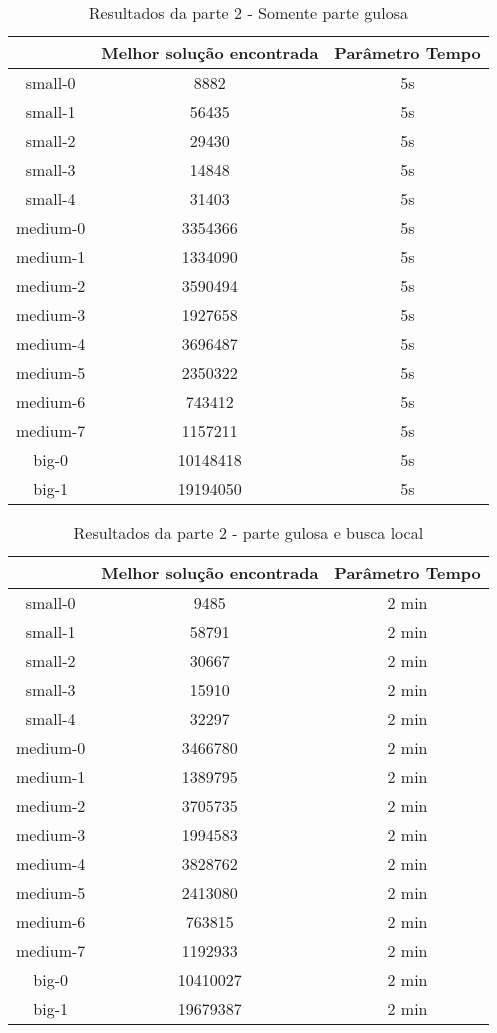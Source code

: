 \documentclass[11pt,letterpaper]{article}
\begin{document}
\begin{table}[h!]
\begin{centering}
\begin{tabular}{|c|c|c|}
\hline 
 & Melhor solução encontrada & Parâmetro Tempo  \tabularnewline
\hline 
\hline 
small-0 & 8882 & 5s \tabularnewline %
\hline 
small-1 & 56435 & 5s  \tabularnewline %
\hline 
small-2 & 29430 & 5s \tabularnewline %
\hline 
small-3 & 14848 & 5s \tabularnewline %
\hline 
small-4 & 31403 & 5s \tabularnewline %
\hline 
medium-0 & 3354366 & 5s \tabularnewline %
\hline 
medium-1 & 1334090 & 5s \tabularnewline %
\hline 
medium-2 & 3590494 & 5s \tabularnewline %
\hline 
medium-3 & 1927658 & 5s \tabularnewline %
\hline 
medium-4 & 3696487 & 5s \tabularnewline %
\hline 
medium-5 & 2350322 & 5s \tabularnewline %
\hline 
medium-6 & 743412 & 5s \tabularnewline %
\hline 
medium-7 & 1157211 & 5s \tabularnewline %
\hline 
big-0 & 10148418 & 5s \tabularnewline %
\hline 
big-1 & 19194050 & 5s \tabularnewline %
\hline 

\end{tabular}
\par\end{centering}
\caption{Resultados da parte 2 - Somente parte gulosa}
\end{table}


\begin{table}[h!]
\begin{centering}
\begin{tabular}{|c|c|c|}
\hline 
 & Melhor solução encontrada & Parâmetro Tempo  \tabularnewline
\hline 
\hline 
small-0 & 9485 & 2 min  \tabularnewline %
\hline 
small-1 & 58791 & 2 min  \tabularnewline %
\hline 
small-2 & 30667 & 2 min  \tabularnewline %
\hline 
small-3 & 15910 & 2 min  \tabularnewline %
\hline 
small-4 & 32297 & 2 min  \tabularnewline %
\hline 
medium-0 & 3466780 & 2 min  \tabularnewline %
\hline 
medium-1 & 1389795 & 2 min  \tabularnewline %
\hline 
medium-2 & 3705735 & 2 min  \tabularnewline %
\hline 
medium-3 & 1994583 & 2 min  \tabularnewline %
\hline 
medium-4 & 3828762 & 2 min  \tabularnewline %
\hline 
medium-5 & 2413080 & 2 min  \tabularnewline %
\hline 
medium-6 & 763815 & 2 min  \tabularnewline %
\hline 
medium-7 & 1192933 & 2 min  \tabularnewline %
\hline 
big-0 & 10410027 & 2 min  \tabularnewline %
\hline 
big-1 & 19679387 & 2 min  \tabularnewline %
\hline 

\end{tabular}
\par\end{centering}
\caption{Resultados da parte 2 - parte gulosa e busca local}
\end{table}

%
%  
\end{document}
